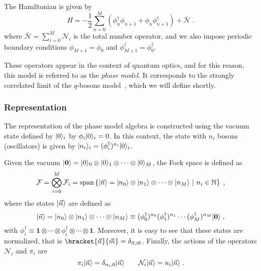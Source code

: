 \documentclass[a4paper,11pt]{amsart}
\begin{document}
The Hamiltonian is given by
\begin{equation}
  H = - \frac{1}{2} \sum_{n =0}^M \left(\phi_n^\dagger \phi_{n+1}
  + \phi_n \phi_{n+1}^\dagger \right) + \bar{\mathcal{N}}\; .
\end{equation}
where \(\bar{\mathcal{N}} = \sum_{i=0}^M \mathcal{N}_i\) is the total
number operator, and we also impose periodic boundary conditions
\(\phi_{M+1} = \phi_0\) and \(\phi_{M+1}^\dagger = \phi_0^\dagger\).

These operators appear in the context of quantum optics, and for this
reason, this model is referred to as the \emph{phase model}. It corresponds to
the strongly correlated limit of the \(q\)-bosons
model~\cite{Bogoliubov:1997soj}, which we will define shortly.


\subsubsection{Representation}
The representation of the phase model algebra is constructed using
the vacuum state defined by \(\lvert0\rangle_i\) by \(\phi_i\lvert0\rangle_i =
0\). In this context, the state with \(n_i\) bosons (oscillators) is
given by \(\lvert n_i\rangle_i = (\phi_i^\dagger)^{n_i} \lvert0\rangle_i\).

Given the vacuum \(\lvert\bm{0}\rangle = \lvert0\rangle_0\otimes \lvert0\rangle_1
\otimes \cdots \otimes  \lvert0\rangle_M\), the Fock space is defined as 
\begin{equation}
  \mathcal{F} = \bigotimes_{i=0}^M \mathcal{F}_i = \mathrm{span}
  \left\{\lvert\vec{n}\rangle = \lvert n_0\rangle\otimes \lvert n_1\rangle \otimes \cdots
  \otimes \lvert n_M\rangle \ | \ n_i \in \mathbb{N} \right\}\; ,
\end{equation}
where the states \(\lvert\vec{n}\rangle\) are defined as 
\begin{equation}
  \lvert\vec{n}\rangle = \lvert n_0\rangle\otimes \lvert n_1\rangle \otimes \cdots \otimes \lvert n_M\rangle 
 \equiv  (\phi_0^\dagger)^{n_0} (\phi_1^\dagger)^{n_1} \cdots  (\phi_M^\dagger)^{n_M} \lvert\bm{0}\rangle \; ,
\end{equation}
with \(\phi_i^\dagger \equiv \bm{1} \otimes \cdots \otimes
\phi_i^\dagger \otimes \cdots \otimes \bm{1}\).  Moreover, it is easy
to see that these states are normalized, that is
\(\bracket{\vec{n}}{\vec{m}}=\delta_{\vec{n}, \vec{m}}\).  Finally,
the actions of the operators \(\mathcal{N}_i\) and \(\pi_i\) are
\begin{equation}
    \pi_i\lvert\vec{n}\rangle  = \delta_{n_i, 0} \lvert\vec{n}\rangle \qquad 
    \mathcal{N}_i\lvert\vec{n}\rangle = n_i \lvert\vec{n}\rangle\; .
\end{equation}
 
\end{document}
